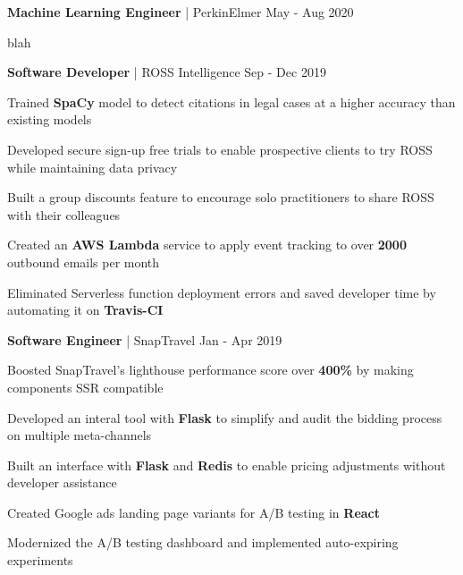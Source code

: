 


\begin{cventries}


\cventry
{\textbf{Machine Learning Engineer} | PerkinElmer}
{May - Aug 2020} %
{ %
\begin{cvitems}
\item {blah}
\end{cvitems}
}


\cventry
{\textbf{Software Developer} | ROSS Intelligence}
{Sep - Dec 2019} %
{ %
\begin{cvitems}
\item {Trained \textbf{SpaCy} model to detect citations in legal cases at a higher accuracy than existing models}
\item {Developed secure sign-up free trials to enable prospective clients to try ROSS while maintaining data privacy}
\item {Built a group discounts feature to encourage solo practitioners to share ROSS with their colleagues}
\item {Created an \textbf{AWS Lambda} service to apply event tracking to over \textbf{2000} outbound emails per month}
\item {Eliminated Serverless function deployment errors and saved developer time by automating it on \textbf{Travis-CI}}
\end{cvitems}
}


\cventry
{\textbf{Software Engineer} | SnapTravel}
{Jan - Apr 2019} %
{ %
\begin{cvitems}
\item {Boosted SnapTravel's lighthouse performance score over \textbf{400\%} by making components SSR compatible}
\item {Developed an interal tool with \textbf{Flask} to simplify and audit the bidding process on multiple meta-channels}
\item {Built an interface with \textbf{Flask} and \textbf{Redis} to enable pricing adjustments without developer assistance}
\item {Created Google ads landing page variants for A/B testing in \textbf{React}}
\item {Modernized the A/B testing dashboard and implemented auto-expiring experiments}
\end{cvitems}
}


\end{cventries}
